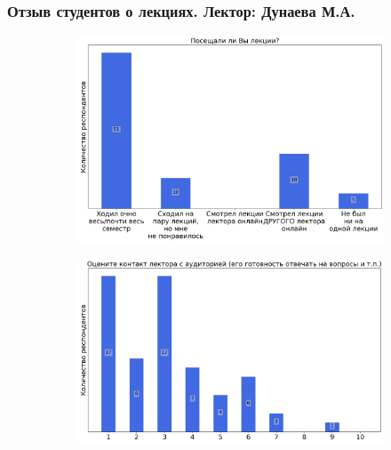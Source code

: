 	\subsubsection{Отзыв студентов о лекциях. Лектор: Дунаева М.А.}

		\begin{figure}[H]
			\centering
            \begin{subfigure}[b]{0.45\textwidth}
				\centering
				\includegraphics[width=\textwidth]{images/3 course/Аналоговая электроника/lecturer-questions-Дунаева М.А.-0.png}
			\end{subfigure}
			\begin{subfigure}[b]{0.45\textwidth}
				\centering
				\includegraphics[width=\textwidth]{images/3 course/Аналоговая электроника/lecturer-marks-Дунаева М.А.-0.png}
			\end{subfigure}
			\begin{subfigure}[b]{0.45\textwidth}
				\centering

\end{subfigure}
\end{figure}

